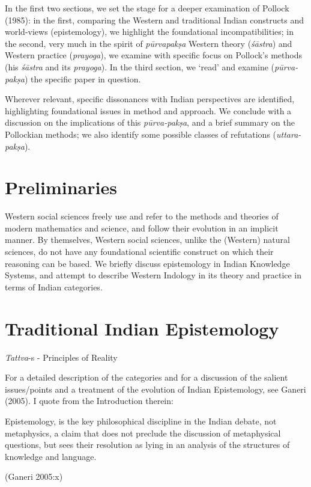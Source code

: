In the first two sections, we set the stage for a deeper examination of Pollock (1985): in the first, comparing the Western and traditional Indian constructs and world-views (epistemology), we highlight the foundational incompatibilities; in the second, very much in the spirit of {\sl pūrvapakṣa} Western theory ({\sl śāstra}) and Western practice ({\sl prayoga}), we examine with specific focus on Pollock's methods (his {\sl śāstra} and its {\sl prayoga}). In the third section, we `read' and examine ({\sl pūrva-pakṣa}) the specific paper in question. 

Wherever relevant, specific dissonances with Indian perspectives are identified, highlighting foundational issues in method and approach. We conclude with a discussion on the implications of this {\sl pūrva-pakṣa}, and a brief summary on the Pollockian methods; we also identify some possible classes of refutations ({\sl uttara-pakṣa}).

\section*{Preliminaries}

Western social sciences freely use and refer to the methods and theories of modern mathematics and science, and follow their evolution in an implicit manner.  By themselves, Western social sciences, unlike the (Western) natural sciences, do not have any foundational scientific construct on which their reasoning can be based. We briefly discuss epistemology in Indian Knowledge Systems, and attempt to describe Western Indology in its theory and practice in terms of Indian categories.
\vskip -10pt

\section*{Traditional Indian Epistemology}
\vskip -10pt

{\sl Tattva}-s - Principles of Reality

For a detailed description of the categories and for a discussion of the salient issues/points and a treatment of the evolution of Indian Epistemology, see Ganeri (2005). I quote from the Introduction therein:
\begin{myquote}
Epistemology, is the key philosophical discipline in the Indian debate, not metaphysics, a claim that does not preclude the discussion of metaphysical questions, but sees their resolution as lying in an analysis of the structures of knowledge and language.

\hfill (Ganeri 2005:x)
\end{myquote}

